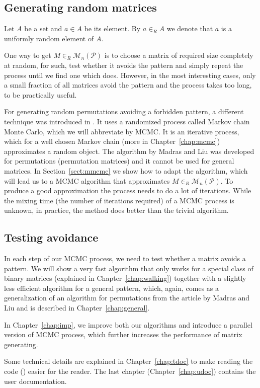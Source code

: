 \subsection*{Generating random matrices}
\begin{ntn}
Let $A$ be a set and $a\in A$ be its element. By $a\in_R A$ we denote that $a$ is a uniformly random element of $A$.
\end{ntn}
One way to get $M\in_R\mathcal{M}_n(\mathcal{P})$ is to choose a matrix of required size completely at random, for such, test whether it avoids the pattern and simply repeat the process until we find one which does. However, in the most interesting cases, only a small fraction of all matrices avoid the pattern and the process takes too long, to be practically useful.

For generating random permutations avoiding a forbidden pattern, a different technique was introduced in \cite{MadrasLiu-mcmc}. It uses a randomized process called Markov chain Monte Carlo, which we will abbreviate by MCMC. It is an iterative process, which for a well chosen Markov chain (more in Chapter~\ref{chap:mcmc}) approximates a random object. The algorithm by Madras and Liu was developed for permutations (permutation matrices) and it cannot be used for general matrices. In Section~\ref{sect:mmcmc} we show how to adapt the algorithm, which will lead us to a MCMC algorithm that approximates $M\in_R\mathcal{M}_n(\mathcal{P})$. To produce a good approximation the process needs to do a lot of iterations. While the mixing time (the number of iterations required) of a MCMC process is unknown, in practice, the method does better than the trivial algorithm.
\subsection*{Testing avoidance}
In each step of our MCMC process, we need to test whether a matrix avoids a pattern. We will show a very fast algorithm that only works for a special class of binary matrices (explained in Chapter~\ref{chap:walking}) together with a slightly less efficient algorithm for a general pattern, which, again, comes as a generalization of an algorithm for permutations from the article by Madras and Liu and is described in Chapter~\ref{chap:general}.

In Chapter~\ref{chap:imp}, we improve both our algorithms and introduce a parallel version of MCMC process, which further increases the performance of matrix generating.

Some technical details are explained in Chapter~\ref{chap:tdoc} to make reading the code (\cite{program}) easier for the reader. The last chapter (Chapter~\ref{chap:udoc}) contains the user documentation.